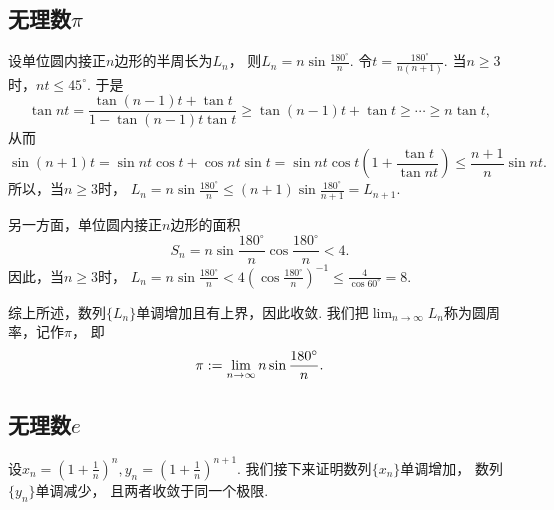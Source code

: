 \subsection{无理数\texorpdfstring{$\pi$}{\textpi}}\label{section:极限.无理数pi}
设单位圆内接正\(n\)边形的半周长为\(L_n\)，
则\(L_n = n \sin\frac{180^\circ}{n}\).
令\(t=\frac{180^\circ}{n(n+1)}\).
当\(n\geq3\)时，\(nt\leq45^\circ\).
于是\begin{equation*}
	\tan nt
	= \frac{\tan(n-1)t + \tan t}{1 - \tan(n-1)t \tan t}
	\geq \tan(n-1)t + \tan t
	\geq \dotsb \geq n \tan t,
\end{equation*}
从而\begin{equation*}
	\sin(n+1)t = \sin nt \cos t + \cos nt \sin t
	= \sin nt \cos t \left(1 + \frac{\tan t}{\tan nt}\right)
	\leq \frac{n+1}n \sin nt.
\end{equation*}
所以，当\(n\geq3\)时，
\(L_n = n \sin\frac{180^\circ}{n}
\leq (n+1) \sin\frac{180^\circ}{n+1} = L_{n+1}\).

另一方面，单位圆内接正\(n\)边形的面积\begin{equation*}
	S_n = n \sin\frac{180^\circ}{n} \cos\frac{180^\circ}{n} < 4.
\end{equation*}
因此，当\(n\geq3\)时，
\(L_n = n \sin\frac{180^\circ}{n}
< 4 \left(\cos\frac{180^\circ}{n}\right)^{-1}
\leq \frac4{\cos60^\circ}
= 8\).

综上所述，数列\(\{L_n\}\)单调增加且有上界，因此收敛.
我们把\(\lim_{n\to\infty} L_n\)称为圆周率，记作\(\pi\)，
即\begin{equation*}
	\pi := \lim_{n\to\infty} n \sin\frac{180^\circ}{n}.
\end{equation*}


\subsection{无理数\texorpdfstring{$e$}{e}}\label{section:极限.无理数e}
设\(x_n=\left(1+\frac1n\right)^n,
y_n=\left(1+\frac1n\right)^{n+1}\).
我们接下来证明数列\(\{x_n\}\)单调增加，
数列\(\{y_n\}\)单调减少，
且两者收敛于同一个极限.

